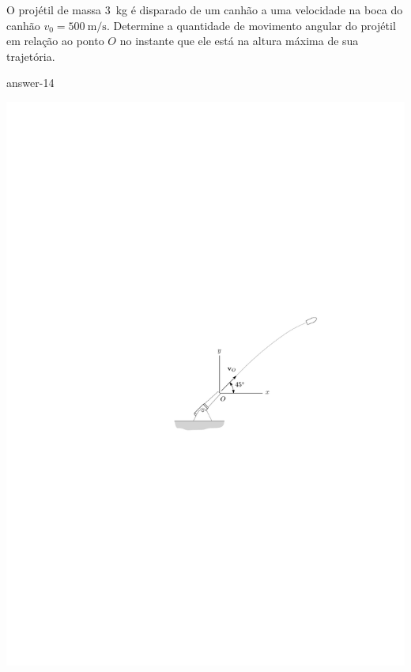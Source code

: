 \item O projétil de massa \SI{3}{\kilogram} é disparado de um canhão a uma velocidade na boca do canhão $v_{0}=\SI{500}{\meter/\second}$. Determine a quantidade de movimento angular do projétil em relação ao ponto $O$ no instante que ele está na altura máxima de sua trajetória.

{answer-14}

\vspace{-1.6cm}
\begin{flushright}
	\includegraphics[scale=1.3]{images/draw_6}
\end{flushright}